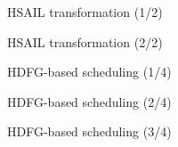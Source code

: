 \documentclass{beamer}
\begin{document}
\begin{CJK}{UTF8}{bkai}
\begin{frame}{HSAIL transformation (1/2)}
    \end{frame}

    \begin{frame}{HSAIL transformation (2/2)}
        
    \end{frame}

    \begin{frame}{HDFG-based scheduling (1/4)}
    \end{frame}
    
    \begin{frame}{HDFG-based scheduling (2/4)}
        
    \end{frame}

    \begin{frame}{HDFG-based scheduling (3/4)}
        \begin{figure}[!ht]
            \begin{center}
                \hfill
                \hfill
            \end{center}
            \label{fig:alloc}
        \end{figure}
    \end{frame}


\end{CJK}
\end{document}
